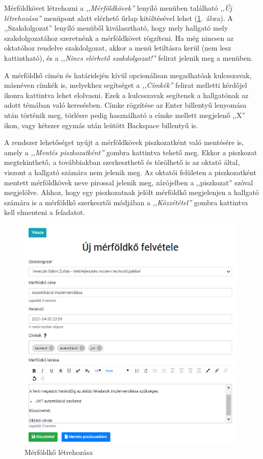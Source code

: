 \documentclass[
]{thesis-ekf}
\theoremstyle{definition}
\theoremstyle{remark}
\begin{document}
	Mérföldkövet létrehozni a \emph{,,Mérföldkövek''} lenyíló menüben található \emph{,,Új létrehozása''} menüpont alatt elérhető űrlap kitöltésével lehet (\ref{fig:oktato_merfoldko_letrehozas}.~ábra). A ,,Szakdolgozat'' lenyíló menüből kiválasztható, hogy mely hallgató mely szakdolgozatához szeretnénk a mérföldkövet rögzíteni. Ha még nincsen az oktatóhoz rendelve szakdolgozat, akkor a menü letiltásra kerül (nem lesz kattintható), és a \emph{,,Nincs elérhető szakdolgozat!''} felirat jelenik meg a menüben.
	
	A mérföldkő címén és határidején kívül opcionálisan megadhatóak kulcsszavak, másnéven címkék is, melyekhez segítséget a \emph{,,Címkék''} felirat melletti kérdőjel ikonra kattintva lehet elolvasni. Ezek a kulcsszavak segítenek a hallgatónak az adott témában való keresésben. Címke rögzítése az Enter billentyű lenyomása után történik meg, törlésre pedig használható a címke mellett megjelenő ,,X'' ikon, vagy kétszer egymás után leütött Backspace billentyű is.
	
	A rendszer lehetőséget nyújt a mérföldkövek piszkozatként való mentésére is, amely a \emph{,,Mentés piszkozatként''} gombra kattintva tehető meg. Ekkor a piszkozat megtekinthető, a továbbiakban szerkeszthető és törölhető is az oktató által, viszont a hallgató számára nem jelenik meg. Az oktatói felületen a piszkozatként mentett mérföldkövek neve pirossal jelenik meg, zárójelben a ,,piszkozat'' szóval megjelölve. Ahhoz, hogy egy piszkozatnak jelölt mérföldkő megjelenjen a hallgató számára is a mérföldkő szerkesztői módjában a \emph{,,Közzététel''} gombra kattintva kell elmenteni a feladatot.
	
	\begin{figure}[!h]
		\centering
		\includegraphics[width=11cm]{kepek/screenshots/oktato_merfoldko_letrehozas.png}
		\caption{Mérföldkő létrehozása}
		\label{fig:oktato_merfoldko_letrehozas}
	\end{figure}
\end{document}

